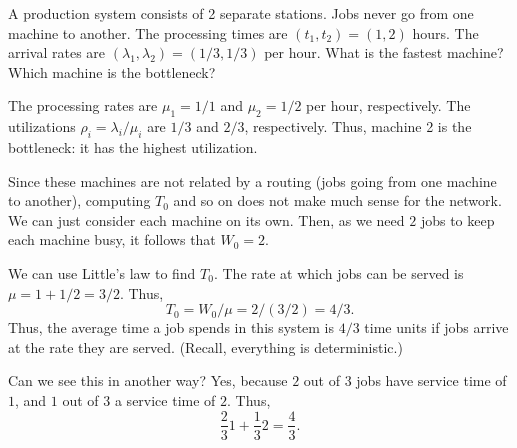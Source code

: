 \begin{question}
  A production system consists of 2 separate stations. Jobs never go
  from one machine to another. The processing times are
  $(t_1, t_2) = (1, 2)$ hours. The arrival rates are
  $(\lambda_1, \lambda_2) = (1/3, 1/3)$ per hour. What is the fastest
  machine? Which machine is the bottleneck? 
  \begin{solution}
    The processing rates are $\mu_1=1/1$ and $\mu_2 = 1/2$ per hour,
    respectively. The utilizations $\rho_i=\lambda_i/\mu_i$ are $1/3$
    and $2/3$, respectively. Thus, machine 2 is the bottleneck: it has
    the highest utilization.

    Since these machines are not related by a routing (jobs going from
    one machine to another), computing $T_0$ and so on does not make
    much sense for the network. We can just consider each machine on
    its own. Then, as we need $2$ jobs to keep each machine busy, it
    follows that $W_0=2$. 

We can use Little's law to find $T_0$. The rate at which jobs can be served is $\mu = 1+1/2 = 3/2$. Thus, 
\begin{equation*}
  T_0 = W_0/\mu = 2/(3/2)=4/3.
\end{equation*}
Thus, the average time a job spends in this system is $4/3$ time units
if jobs arrive at the rate they are served. (Recall, everything is
deterministic.)

Can we see this in another way? Yes, because $2$ out of $3$ jobs have service time of $1$, and $1$ out of $3$ a service time of $2$. Thus,
\begin{equation*}
  \frac23 1 + \frac 1 3 2 = \frac 4 3.
\end{equation*}
  \end{solution}
\end{question}



